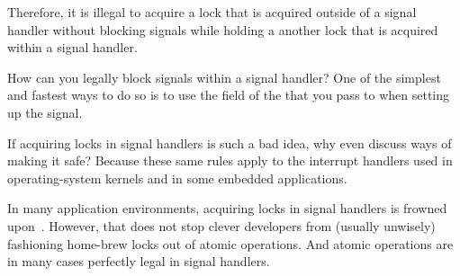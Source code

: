 \begin{enumerate}
	Therefore, it is illegal to acquire a lock that is acquired outside
	of a signal handler without blocking signals while holding
	a another lock that is acquired within a signal handler.

\QuickQ{}
	How can you legally block signals within a signal handler?
\QuickA{}
	One of the simplest and fastest ways to do so is to use
	the  field of the  that
	you pass to  when setting up the signal.

\QuickQ{}
	If acquiring locks in signal handlers is such a bad idea, why
	even discuss ways of making it safe?
\QuickA{}
	Because these same rules apply to the interrupt handlers used in
	operating-system kernels and in some embedded applications.

	In many application environments, acquiring locks in signal
	handlers is frowned upon~\cite{OpenGroup1997pthreads}.
	However, that does not stop clever developers from (usually
	unwisely) fashioning home-brew locks out of atomic operations.
	And atomic operations are in many cases perfectly legal in
	signal handlers.


\end{enumerate}
